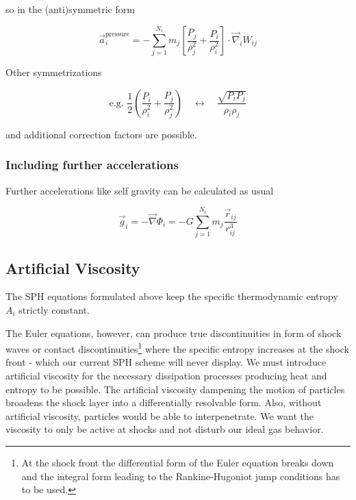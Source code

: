 so in the (anti)symmetric form

\begin{equation}
    \boxed{\vec{a}_i^{\text{pressure}} = -\sum_{j=1}^{N_i} m_j\left[\frac{P_j}{\rho_j^2}+\frac{P_i}{\rho_i^2}\right] \cdot \vec{\nabla}_i W_{i j}}
\end{equation}




Other symmetrizations

\begin{equation}
    \text{e.g. } \frac{1}{2} \left( \frac{P_i}{\rho_i^2} + \frac{P_j}{\rho_j^2} \right) \quad \leftrightarrow \quad \frac{\sqrt{P_i P_j}}{\rho_i \rho_j} 
\end{equation}

and additional correction factors are possible.

\subsubsection{Including further accelerations}
Further accelerations like self gravity can be calculated as usual

\begin{equation}
    \vec{g}_i = -\vec{\nabla} \Phi_i = - G \sum_{j=1}^{N_i} m_j \frac{\vec{r}_{i j}}{r_{i j}^3}
\end{equation}

\subsection{Artificial Viscosity}
The SPH equations formulated above keep the specific thermodynamic entropy $A_i$ strictly constant.
 
The Euler equations, however, can produce true discontinuities in form of shock waves or contact discontinuities\footnote{At the shock front the differential form of the Euler equation breaks down and the integral form leading to the Rankine-Hugoniot jump conditions has to be used.} where the specific entropy increases at the shock front - which our current SPH scheme will never display.
We must introduce artificial viscosity for the necessary dissipation processes producing heat and entropy to be possible. The artificial viscosity dampening the motion of particles broadens the shock layer into a differentially resolvable form.
Also, without artificial viscosity, particles would be able to interpenetrate.
We want the viscosity to only be active at shocks and not disturb our ideal gas behavior.

